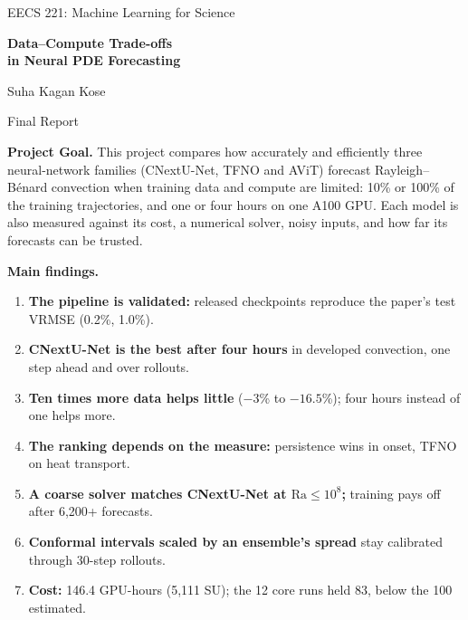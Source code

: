 \documentclass[11pt]{article}
\begin{document}

\begin{center}
    {\large EECS 221: Machine Learning for Science\par}
    \vspace{5pt}
    {\LARGE\bfseries
    Data--Compute Trade-offs\\[3pt]
    in Neural PDE Forecasting\par}
    \vspace{7pt}
    {\Large Suha Kagan Kose\par}
    \vspace{6pt}
    {\large Final Report\par}
\end{center}

\textbf{Project Goal.} This project compares how accurately and efficiently three neural-network families
(CNextU-Net, TFNO and AViT) forecast Rayleigh--B\'enard convection when training data and compute are limited: 10\% or
100\% of the training trajectories, and one or four hours on one A100 GPU. Each model is also measured against its cost,
a numerical solver, noisy inputs, and how far its forecasts can be trusted.

\textbf{Main findings.}
\begin{enumerate}\setlength{\itemsep}{0pt}\setlength{\parskip}{1pt}
    \item \textbf{The pipeline is validated:} released checkpoints reproduce the paper's test VRMSE (0.2\%, 1.0\%).
    \item \textbf{CNextU-Net is the best after four hours} in developed convection, one step ahead and over rollouts.
    \item \textbf{Ten times more data helps little} ($-3$\% to $-16.5$\%); four hours instead of one helps more.
    \item \textbf{The ranking depends on the measure:} persistence wins in onset, TFNO on heat transport.
    \item \textbf{A coarse solver matches CNextU-Net at $\mathrm{Ra}\le10^8$;} training pays off after 6,200+ forecasts.
    \item \textbf{Conformal intervals scaled by an ensemble's spread} stay calibrated through 30-step rollouts.
    \item \textbf{Cost:} 146.4 GPU-hours (5,111 SU); the 12 core runs held 83, below the 100 estimated.
\end{enumerate}
\end{document}
